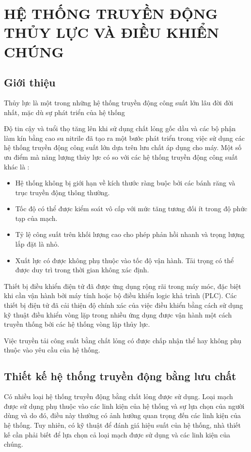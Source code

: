 \documentclass[THUY_LUC_KHI_NEN.tex]{subfiles}
\begin{document}
\chapter{HỆ THỐNG TRUYỀN ĐỘNG THỦY LỰC VÀ ĐIỀU KHIỂN CHÚNG}
\section{Giới thiệu}
Thủy lực là một trong những hệ thống truyền động công suất lớn lâu đời đời nhất, mặc dù sự phát triển của hệ thống 

Độ tin cậy và tuổi thọ tăng lên khi sử dụng chất lỏng gốc dầu và các bộ phận làm kín bằng cao su nitrile đã tạo ra một bước phát triển trong việc sử dụng các hệ thống truyền động công suất lớn dựa trên lưu chất áp dụng cho máy. Một số ưu điểm mà năng lượng thủy lực có so với các hệ thống truyền động công suất khác là :
\begin{itemize}
    \item Hệ thống không bị giới hạn về kích thước ràng buộc bởi các bánh răng và trục truyền động thông thường.
    \item Tốc độ có thể được kiểm soát vô cấp với mức tăng tương đối ít
    trong độ phức tạp của mạch.
    \item Tỷ lệ công suất trên khối lượng cao cho phép phản hồi nhanh và trọng lượng lắp đặt là nhỏ.
    \item Xuất lực có được không phụ thuộc vào tốc độ vận hành. Tải trọng  có thể được duy trì trong thời gian không xác định.
\end{itemize}

Thiết bị điều khiển điện tử đã được ứng dụng rộng rãi trong máy móc, đặc biệt khi cần vận hành bởi máy tính hoặc bộ điều khiển logic khả trình (PLC). Các thiết bị điện tử đã cải thiện độ chính xác của việc điều khiển bằng cách sử dụng kỹ thuật điều khiển vòng lặp trong nhiều ứng dụng được vận hành một cách truyền thống bởi các hệ thống vòng lặp thủy lực.

Việc truyền tải công suất bằng chất lỏng có được chấp nhận thể hay không  phụ thuộc vào yêu cầu của hệ thống.
\section{Thiết kế hệ thống truyền động bằng lưu chất}
Có nhiều loại hệ thống truyền động bằng chất lỏng được sử dụng. Loại mạch được sử dụng phụ thuộc vào các linh kiện của hệ thống và sự lựa chọn của người dùng và do đó, điều này thường có ảnh hưởng quan trọng đến các linh kiện của hệ thống. Tuy nhiên, có kỹ thuật để đánh giá hiệu suất của hệ thống, nhà thiết kế cần phải biết để lựa chọn cả loại mạch được sử dụng và các linh kiện của chúng.
\end{document}
